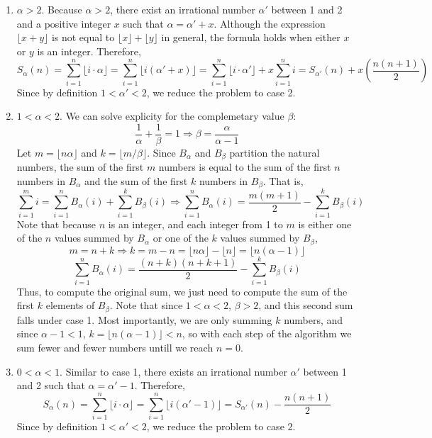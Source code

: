 \documentclass[oneside, 12pt]{article}
\begin{document}
\begin{enumerate}
\item 
	$\alpha > 2$. Because $\alpha > 2$, there exist an irrational number $\alpha'$ between 1 and 2 and a positive integer $x$ such that $\alpha = \alpha' + x$. Although the expression $\lfloor x + y \rfloor$ is not equal to $\lfloor x \rfloor + \lfloor y \rfloor$ in general, the formula holds when either $x$ or $y$ is an integer. Therefore, 
	\[
	S_{\alpha}(n) = \sum_{i=1}^n \lfloor i \cdot \alpha \rfloor = \sum_{i=1}^n \lfloor i (\alpha' + x) \rfloor = \sum_{i=1}^n \lfloor i \cdot \alpha' \rfloor + x\sum_{i=1}^n i = S_{\alpha'}(n) + x \left(\frac{n(n+1)}{2} \right)
	\] 
	Since by definition $1 < \alpha' < 2$, we reduce the problem to case 2. 
\item
	$1 < \alpha < 2$. We can solve explicity for the complemetary value $\beta$:
	\[
	\frac{1}{\alpha} + \frac{1}{\beta} = 1 \Rightarrow \beta = \frac{\alpha}{\alpha - 1}
	\]
	Let $m = \lfloor n\alpha \rfloor$ and $k = \lfloor m/\beta \rfloor$. Since $B_{\alpha}$ and $B_{\beta}$ partition the natural numbers, the sum of the first $m$ numbers is equal to the sum of the first $n$ numbers in $B_{\alpha}$ and the sum of the first $k$ numbers in $B_{\beta}$. That is, 
	\[
	\sum_{i=1}^m i = \sum_{i = 1}^n B_{\alpha}(i) + \sum_{i = 1}^k B_{\beta}(i) \Rightarrow \sum_{i=1}^n B_{\alpha}(i) = \frac{m(m+1)}{2} - \sum_{i = 1}^k B_{\beta}(i) 
	\]
	Note that because $n$ is an integer, and each integer from 1 to $m$ is either one of the $n$ values summed by $B_{\alpha}$ or one of the $k$ values summed by $B_{\beta}$,
	\[
	m = n + k \Rightarrow k = m - n = \lfloor n \alpha \rfloor - \lfloor n \rfloor = \lfloor n (\alpha - 1) \rfloor
	\]
	\[
	\sum_{i=1}^n B_{\alpha}(i) = \frac{(n+k)(n+k+1)}{2} - \sum_{i=1}^k B_{\beta}(i)
	\]
	Thus, to compute the original sum, we just need to compute the sum of the first $k$ elements of $B_{\beta}$. Note that since $1 < \alpha < 2$, $\beta > 2$, and this second sum falls under case 1. Most importantly, we are only summing $k$ numbers, and since $\alpha-1 < 1$, $k = \lfloor n (\alpha  - 1) \rfloor < n$, so with each step of the algorithm we sum fewer and fewer numbers untill we reach $n = 0$. 
\item
	$0 < \alpha < 1$. Similar to case 1, there exists an irrational number $\alpha'$ between 1 and 2 such that $\alpha = \alpha' - 1$. Therefore, 
	\[
	S_{\alpha}(n) = \sum_{i=1}^n \lfloor i \cdot \alpha \rfloor = \sum_{i=1}^n \lfloor i (\alpha' - 1) \rfloor = S_{\alpha'}(n) - \frac{n(n+1)}{2}
	\]
	Since by definition $1 < \alpha' < 2$, we reduce the problem to case 2. 
\end{enumerate}
\end{document}

